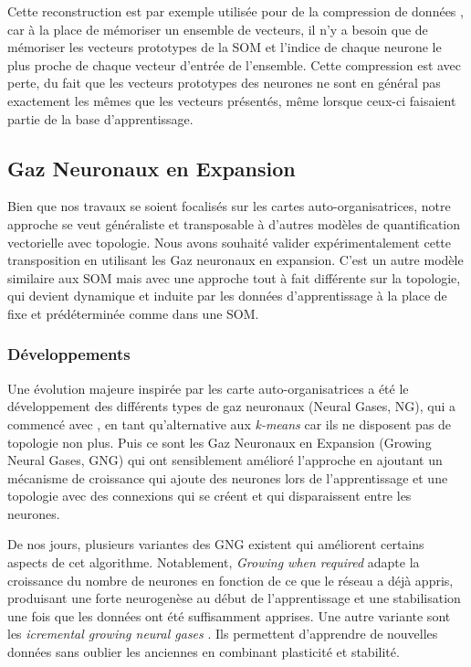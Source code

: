 	Cette reconstruction est par exemple utilisée pour de la compression de données \cite{ettaouil2012improved}, car à la place de mémoriser un ensemble de vecteurs, il n'y a besoin que de mémoriser les vecteurs prototypes de la SOM et l'indice de chaque neurone le plus proche de chaque vecteur d'entrée de l'ensemble. Cette compression est avec perte, du fait que les vecteurs prototypes des neurones ne sont en général pas exactement les mêmes que les vecteurs présentés, même lorsque ceux-ci faisaient partie de la base d'apprentissage.

	\subsection{Gaz Neuronaux en Expansion}

	Bien que nos travaux se soient focalisés sur les cartes auto-organisatrices, notre approche se veut généraliste et transposable à d'autres modèles de quantification vectorielle avec topologie. Nous avons souhaité valider expérimentalement cette transposition en utilisant les Gaz neuronaux en expansion. C'est un autre modèle similaire aux SOM mais avec une approche tout à fait différente sur la topologie, qui devient dynamique et induite par les données d'apprentissage à la place de fixe et prédéterminée comme dans une SOM. 

	\subsubsection{Développements}

	Une évolution majeure inspirée par les carte auto-organisatrices a été le développement des différents types de gaz neuronaux (Neural Gases, NG), qui a commencé avec \cite{martinetz1991neural}, en tant qu'alternative aux \textit{k-means} car ils ne disposent pas de topologie non plus. Puis ce sont les Gaz Neuronaux en Expansion (Growing Neural Gases, GNG) \cite{fritzke1995growing} qui ont sensiblement amélioré l'approche en ajoutant un mécanisme de croissance qui ajoute des neurones lors de l'apprentissage et une topologie avec des connexions qui se créent et qui disparaissent entre les neurones.

	De nos jours, plusieurs variantes des GNG existent qui améliorent certains aspects de cet algorithme. Notablement, \textit{Growing when required} \cite{marsland2002self} adapte la croissance du nombre de neurones en fonction de ce que le réseau a déjà appris, produisant une forte neurogenèse au début de l'apprentissage et une stabilisation une fois que les données ont été suffisamment apprises. Une autre variante sont les \textit{icremental growing neural gases} \cite{prudent2005incremental}. Ils permettent d'apprendre de nouvelles données sans oublier les anciennes en combinant plasticité et stabilité.


